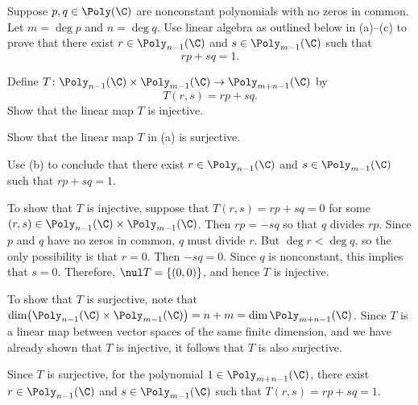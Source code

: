 \begin{exc}
\begin{exercise}
Suppose $p,q\in\Poly(\C)$ are nonconstant polynomials with no zeros in common.
Let $m=\deg p$ and $n=\deg q$. Use linear algebra as outlined below in
(a)--(c) to prove that there exist $r\in\Poly_{n-1}(\C)$ and
$s\in\Poly_{m-1}(\C)$ such that
\[ rp+sq=1. \]
\begin{parts}
\item Define $T\colon\Poly_{n-1}(\C)\times\Poly_{m-1}(\C)\to\Poly_{m+n-1}(\C)$
  by
  \[ T(r,s)=rp+sq. \]
  Show that the linear map $T$ is injective.
\item Show that the linear map $T$ in (a) is surjective.
\item Use (b) to conclude that there exist $r\in\Poly_{n-1}(\C)$ and
  $s\in\Poly_{m-1}(\C)$ such that $rp+sq=1$.
\end{parts}
\end{exercise}
\begin{solution}
\begin{parts}
\item To show that $T$ is injective, suppose that $T(r,s)=rp+sq=0$ for some
  $(r,s)\in\Poly_{n-1}(\C)\times\Poly_{m-1}(\C)$. Then $rp=-sq$ so that $q$
  divides $rp$. Since $p$ and $q$ have no zeros in common, $q$ must divide
  $r$. But $\deg r<\deg q$, so the only possibility is that $r=0$. Then
  $-sq=0$. Since $q$ is nonconstant, this implies that $s=0$. Therefore,
  $\nul T=\{(0,0)\}$, and hence $T$ is injective.
\item To show that $T$ is surjective, note that
  $\dim\bigl(\Poly_{n-1}(\C)\times\Poly_{m-1}(\C)\bigr)=n+m
  =\dim\Poly_{m+n-1}(\C)$. Since $T$ is a linear map between vector spaces of
  the same finite dimension, and we have already shown that $T$ is injective,
  it follows that $T$ is also surjective.
\item Since $T$ is surjective, for the polynomial $1\in\Poly_{m+n-1}(\C)$,
  there exist $r\in\Poly_{n-1}(\C)$ and $s\in\Poly_{m-1}(\C)$ such that
  $T(r,s)=rp+sq=1$. \qedhere
\end{parts}
\end{solution}
\end{exc}

\renewcommand\thesection{\thechapter\Alph{section}}
